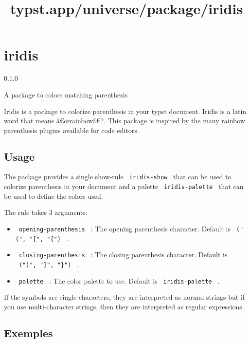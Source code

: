 \title{typst.app/universe/package/iridis}

\label{banner}
\section{iridis}\label{iridis}

{ 0.1.0 }

A package to colors matching parenthesis

\label{readme}
Iridis is a package to colorize parenthesis in your typst document.
Iridis is a latin word that means â€œrainbowâ€?. This package is
inspired by the many rainbow parenthesis plugins available for code
editors.

\subsection{Usage}\label{usage}

The package provides a single show-rule \texttt{\ iridis-show\ } that
can be used to colorize parenthesis in your document and a palette
\texttt{\ iridis-palette\ } that can be used to define the colors used.

The rule takes 3 arguments:

\begin{itemize}
\tightlist
\item
  \texttt{\ opening-parenthesis\ } : The opening parenthesis character.
  Default is \texttt{\ ("(",\ "{[}",\ "\{")\ } .
\item
  \texttt{\ closing-parenthesis\ } : The closing parenthesis character.
  Default is \texttt{\ (")",\ "{]}",\ "\}")\ } .
\item
  \texttt{\ palette\ } : The color palette to use. Default is
  \texttt{\ iridis-palette\ } .
\end{itemize}

If the symbols are single characters, they are interpreted as normal
strings but if you use multi-character strings, then they are
interpreted as regular expressions.

\subsection{Exemples}\label{exemples}

